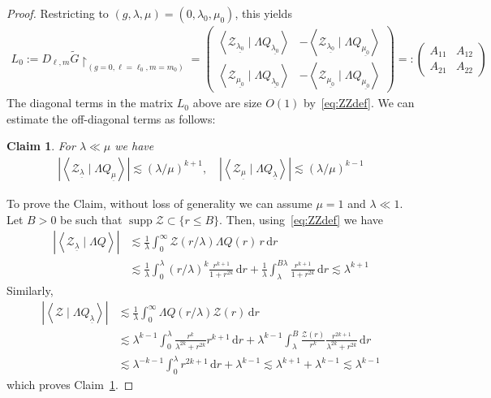 \documentclass[10pt,reqno]{amsart}
\def\cZ {\mathcal{Z}}
\newcommand{\supp}{\operatorname{supp}}
\newcommand{\Red}[1]{{\color{red} #1}}
\newcommand{\ZZ}{\mathcal{Z}}
\newcommand{\la}{\lambda}
\newcommand{\La}{\Lambda}
\newcommand{\ti}{\widetilde}
\newcommand{\U}{\underline}
\newcommand{\ang}[1]{\left\langle{#1}\right\rangle}
\newcommand{\abs}[1]{\left\lvert{#1}\right\rvert}
\newcommand{\EQ}[1]{\begin{equation}\begin{split} #1 \end{split}\end{equation}}
\newcommand{\pmat}[1]{\begin{pmatrix} #1 \end{pmatrix}}
\numberwithin{equation}{section}
\newtheorem{claim}[thm]{Claim}
\theoremstyle{remark}
\newcommand{\rest}{\!\!\restriction}
\newcommand{\ud}{\mathrm{d}}
\newcommand{\0}{\emptyset}
\begin{document}
\begin{proof}
Restricting to $(g, \la, \mu) = (0, \la_0, \mu_0)$, this yields  
\EQ{
L_0:= D_{\ell, m} \ti G\rest_{(g=0, \ell = \ell_0, m=m_0)} =  \pmat{ \ang{ \ZZ_{\U{\la_0}}\mid \La Q_{\U{\la_0}}} &  {-}\ang{\ZZ_{\U{\la_0}} \mid \La Q_{\U{\mu_0}}} \\  \ang{ \ZZ_{\U{\mu_0}} \mid \La Q_{ \U{\la_0}}} & {-}\ang{ \ZZ_{\U{\mu_0}} \mid \La Q_{\U{\mu_0}}}} =: \pmat{ A_{11} & A_{12} \\ A_{21} & A_{22}}
}
The diagonal terms in the matrix $L_0$ above are size $O(1)$ by~\eqref{eq:ZZdef}. We can estimate the off-diagonal terms as follows:
  \begin{claim} \label{c:M12est}
  For $\lambda \ll \mu$ we have
 \begin{align} \label{eq:M12}
\abs{\ang{ \cZ_{\U{\lambda}}\mid \Lambda Q_{\U{\mu}}}}  \lesssim ({\la/\mu})^{k+1}, \quad 
\abs{\ang{ \cZ_{\U{\mu}}\mid \Lambda Q_{\U{\lambda}}}} \lesssim ({\la/\mu})^{k-1}
 \end{align} 
 \end{claim}
To prove the Claim, without loss of generality we can assume $\mu = 1$ and $\la \ll 1$. Let $B>0$ be such that $\supp \ZZ \subset \{ r \le  B\}$. Then, using~\eqref{eq:ZZdef} we have 
\EQ{
\abs{\ang{ \cZ_{\U{\lambda}}\mid \Lambda Q}}& \lesssim \frac{1}{\la}  \int_0^\infty \ZZ(r/ \la) \La Q(r) \, r \, \ud r \\
 & \lesssim \frac{1}{\la} \int_0^\la (r/ \la)^k \frac{r^{k+1}}{1 + r^{2k}} \, \ud r + \frac{1}{\la} \int_\la^{B \la}  \frac{r^{k+1}}{1 + r^{2k}} \, \ud r   \lesssim \la^{k+1} 
}
Similarly, 
\EQ{
\abs{\ang{ \cZ\mid \Lambda Q_{\U{\lambda}}}}  & \lesssim \frac{1}{\la} \int_0^\infty \La Q( r/ \la) \ZZ(r) \, \ud r \\
& \lesssim  \la^{k-1} \int_0^\la \frac{ r^k}{ \la^{2k} + r^{2k} } r^{k+1} \, \ud r +  \la^{k-1}  \int_\la^B \frac{\ZZ(r)}{r^k} \frac{ r^{2k+1}}{ \la^{2k} + r^{2k} } \,\ud r \\
& \lesssim \la^{-k-1} \int_0^\la r^{2k+1} \, \ud r  +  \la^{k-1}  \lesssim \la^{k+1} + \la^{k-1}  \lesssim \la^{k-1} 
}
which proves Claim~\ref{c:M12est}. 


\end{proof}
\end{document}
